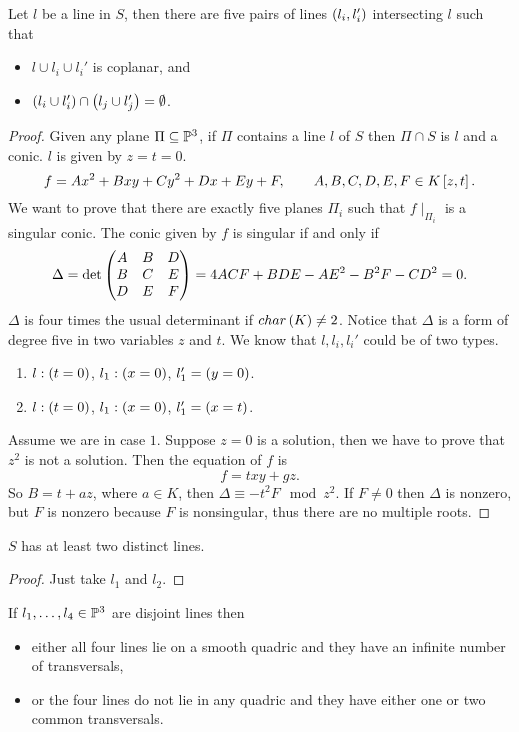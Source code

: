 
\begin{proposition}
Let $ l $ be a line in $ S $, then there are five pairs of lines $ \rb{l_i, l_i'} $ intersecting $ l $ such that
\begin{itemize}
\item $ l \cup l_i \cup l_i' $ is coplanar, and
\item $ \rb{l_i \cup l_i'} \cap \rb{l_j \cup l_j'} = \emptyset $.
\end{itemize}
\end{proposition}

\begin{proof}
Given any plane $ \Pi \subseteq \P^3 $, if $ \Pi $ contains a line $ l $ of $ S $ then $ \Pi \cap S $ is $ l $ and a conic. $ l $ is given by $ z = t = 0 $.
$$ f = Ax^2 + Bxy + Cy^2 + Dx + Ey + F, \qquad A, B, C, D, E, F \in K\sb{z, t}. $$
We want to prove that there are exactly five planes $ \Pi_i $ such that $ f \mid_{\Pi_i} $ is a singular conic. The conic given by $ f $ is singular if and only if
$$ \Delta = \det\threebythree{A}{B}{D}{B}{C}{E}{D}{E}{F} = 4ACF + BDE - AE^2 - B^2F - CD^2 = 0. $$
$ \Delta $ is four times the usual determinant if $ char\rb{K} \ne 2 $. Notice that $ \Delta $ is a form of degree five in two variables $ z $ and $ t $. We know that $ l, l_i, l_i' $ could be of two types.
\begin{enumerate}
\item $ l : \rb{t = 0} $, $ l_1 : \rb{x = 0} $, $ l_1' = \rb{y = 0} $.
\item $ l : \rb{t = 0} $, $ l_1 : \rb{x = 0} $, $ l_1' = \rb{x = t} $.
\end{enumerate}
Assume we are in case $ 1 $. Suppose $ z = 0 $ is a solution, then we have to prove that $ z^2 $ is not a solution. Then the equation of $ f $ is
$$ f = txy + gz. $$
So $ B = t + az $, where $ a \in K $, then $ \Delta \equiv -t^2F \mod z^2 $. If $ F \ne 0 $ then $ \Delta $ is nonzero, but $ F $ is nonzero because $ F $ is nonsingular, thus there are no multiple roots.
\end{proof}

\begin{corollary}
$ S $ has at least two distinct lines.
\end{corollary}

\begin{proof}
Just take $ l_1 $ and $ l_2 $.
\end{proof}

\begin{lemma}
If $ l_1, \dots, l_4 \in \P^3 $ are disjoint lines then
\begin{itemize}
\item either all four lines lie on a smooth quadric and they have an infinite number of transversals,
\item or the four lines do not lie in any quadric and they have either one or two common transversals.
\end{itemize}
\end{lemma}

